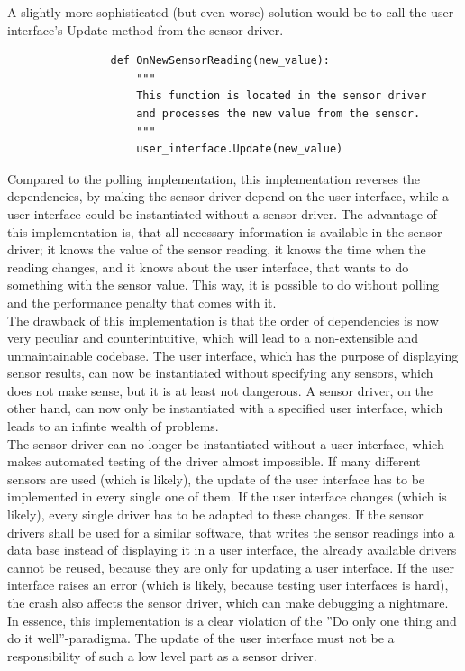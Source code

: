 			A slightly more sophisticated (but even worse) solution would be to call the user interface's Update-method from the sensor driver.
			\begin{verbatim}
				def OnNewSensorReading(new_value):
					"""
					This function is located in the sensor driver
					and processes the new value from the sensor.
					"""
					user_interface.Update(new_value)
			\end{verbatim}
			Compared to the polling implementation, this implementation reverses the dependencies, by making the sensor driver depend on the user interface, while a user interface could be instantiated without a sensor driver.
			The advantage of this implementation is, that all necessary information is available in the sensor driver; it knows the value of the sensor reading, it knows the time when the reading changes, and it knows about the user interface, that wants to do something with the sensor value.
			This way, it is possible to do without polling and the performance penalty that comes with it.\\
			The drawback of this implementation is that the order of dependencies is now very peculiar and counterintuitive, which will lead to a non-extensible and unmaintainable codebase.
			The user interface, which has the purpose of displaying sensor results, can now be instantiated without specifying any sensors, which does not make sense, but it is at least not dangerous.
			A sensor driver, on the other hand, can now only be instantiated with a specified user interface, which leads to an infinte wealth of problems.\\
			The sensor driver can no longer be instantiated without a user interface, which makes automated testing of the driver almost impossible.
			If many different sensors are used (which is likely), the update of the user interface has to be implemented in every single one of them.
			If the user interface changes (which is likely), every single driver has to be adapted to these changes.
			If the sensor drivers shall be used for a similar software, that writes the sensor readings into a data base instead of displaying it in a user interface, the already available drivers cannot be reused, because they are only for updating a user interface.
			If the user interface raises an error (which is likely, because testing user interfaces is hard), the crash also affects the sensor driver, which can make debugging a nightmare.\\
			In essence, this implementation is a clear violation of the ''Do only one thing and do it well''-paradigma.
			The update of the user interface must not be a responsibility of such a low level part as a sensor driver.

